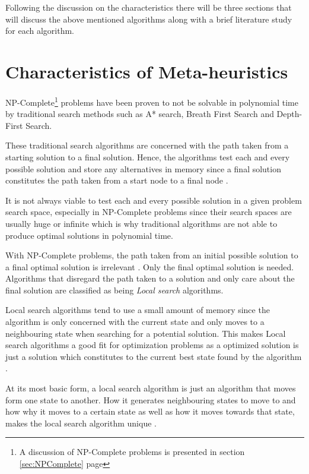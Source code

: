 Following the discussion on the characteristics there will be three sections that will discuss the above mentioned algorithms along with a brief literature study for each algorithm. 

\section{Characteristics of Meta-heuristics}
NP-Complete\footnote{A discussion of NP-Complete problems is presented in section \ref{sec:NPComplete} page \pageref{sec:NPComplete}} problems have been proven to not be solvable in polynomial time by traditional search methods such as A* search, Breath First Search and Depth-First Search. 

These traditional search algorithms are concerned with the path taken from a starting solution to a final solution. Hence, the algorithms test each and every possible solution and store any alternatives in memory since a final solution constitutes the path taken from a start node to a final node \cite{AIModernApproach}.

It is not always viable to test each and every possible solution in a given problem search space, especially in NP-Complete problems since their search spaces are usually huge or infinite which is why traditional algorithms are not able to produce optimal solutions in polynomial time\cite{AIModernApproach}.

With NP-Complete problems, the path taken from an initial possible solution to a final optimal solution is irrelevant \cite{AIModernApproach}. Only the final optimal solution is needed. Algorithms that disregard the path taken to a solution and only care about the final solution are classified as being \emph{Local search} algorithms\cite{AIModernApproach}.

Local search algorithms tend to use a small amount of memory since the algorithm is only concerned with the current state and only moves to a neighbouring state when searching for a potential solution. This makes Local search algorithms a good fit for optimization problems as a optimized solution is just a solution which constitutes to the current best state found by the algorithm \cite{AIModernApproach,NonlinearGlobalTabu}. 

At its most basic form, a local search algorithm is just an algorithm that moves form one state to another. How it generates neighbouring states to move to and how why it moves to a certain state as well as how it moves towards that state, makes the local search algorithm unique \cite{AIModernApproach,CompuIntelligenceIntro,NonlinearGlobalTabu}.

